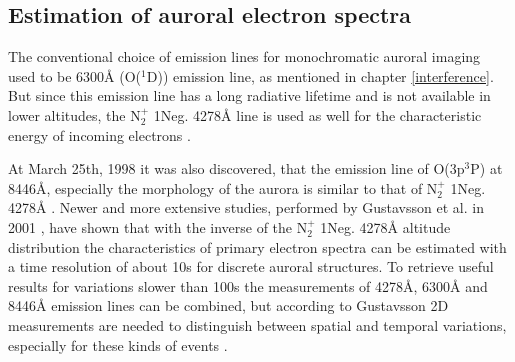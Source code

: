 \subsection{Estimation of auroral electron spectra}
The conventional choice of emission lines for monochromatic auroral imaging used to be 6300Å (O($^1$D)) emission line, as mentioned in chapter \ref{interference}. But since this emission line has a long radiative lifetime and is not available in lower altitudes, the N$_2^+$ 1Neg. 4278Å line is used as well for the characteristic energy of incoming electrons \citep{brandstrom2003auroral}.

At March 25th, 1998 it was also discovered, that the emission line of O(3p$^3$P) at 8446Å, especially the morphology of the aurora is similar to that of N$_2^+$ 1Neg. 4278Å \citep{brandstrom2003auroral}.
Newer and more extensive studies, performed by Gustavsson et al. in 2001 \citep{brandstrom2003auroral}, have shown that with the inverse of the N$_2^+$ 1Neg. 4278Å altitude distribution the characteristics of primary electron spectra can be estimated with a time resolution of about 10s for discrete auroral structures. 
To retrieve useful results for variations slower than 100s the measurements of 4278Å, 6300Å and 8446Å emission lines can be combined, but according to Gustavsson 2D measurements are needed to distinguish between spatial and temporal variations, especially for these kinds of events \citep{brandstrom2003auroral}.


